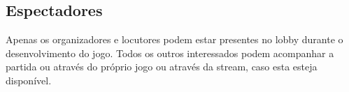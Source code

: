 \subsection{Espectadores}

Apenas os organizadores e locutores podem estar presentes no lobby durante o desenvolvimento do jogo. Todos os outros interessados podem acompanhar a partida ou através do próprio jogo ou através da stream, caso esta esteja disponível.